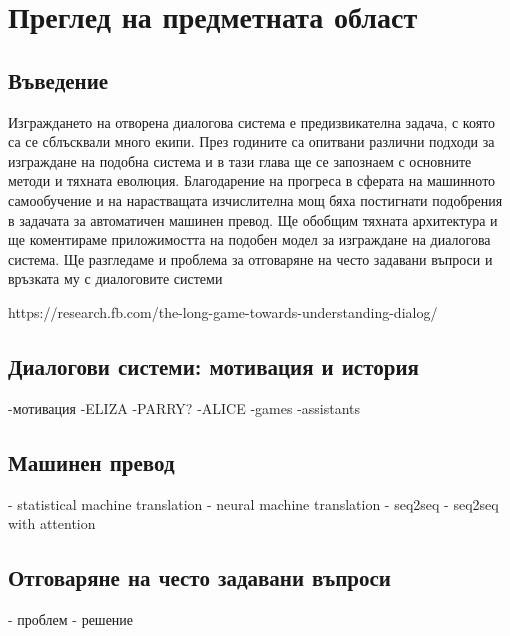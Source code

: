 \chapter{Преглед на предметната област} %

\label{Chapter2} 


\section{Въведение}
Изграждането на отворена диалогова система е предизвикателна задача, с която са се сблъсквали много екипи. През годините са опитвани различни подходи за изграждане на подобна система и в тази глава ще се запознаем с основните методи и тяхната еволюция. 
Благодарение на прогреса в сферата на машинното самообучение и на нарастващата изчислителна мощ бяха постигнати подобрения в задачата за автоматичен машинен превод. Ще обобщим тяхната архитектура и ще коментираме приложимостта на подобен модел за изграждане на диалогова система.
Ще разгледаме и проблема за отговаряне на често задавани въпроси и връзката му с диалоговите системи


https://research.fb.com/the-long-game-towards-understanding-dialog/

\section{Диалогови системи: мотивация и история}

-мотивация
-ELIZA
-PARRY?
-ALICE
-games
-assistants

\section{Машинен превод}
- statistical machine translation
- neural machine translation
- seq2seq
- seq2seq with attention

\section{Отговаряне на често задавани въпроси}
- проблем
- решение

